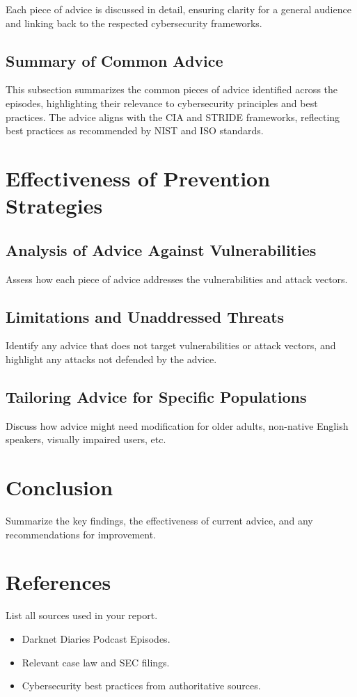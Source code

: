 \documentclass[11pt]{article}
\begin{document}
Each piece of advice is discussed in detail, ensuring clarity for a general audience and linking back to the respected cybersecurity frameworks.

\subsection{Summary of Common Advice}
This subsection summarizes the common pieces of advice identified across the episodes, highlighting their relevance to cybersecurity principles and best practices. The advice aligns with the CIA and STRIDE frameworks, reflecting best practices as recommended by NIST and ISO standards.

\section{Effectiveness of Prevention Strategies}
\subsection{Analysis of Advice Against Vulnerabilities}
Assess how each piece of advice addresses the vulnerabilities and attack vectors.

\subsection{Limitations and Unaddressed Threats}
Identify any advice that does not target vulnerabilities or attack vectors, and highlight any attacks not defended by the advice.

\subsection{Tailoring Advice for Specific Populations}
Discuss how advice might need modification for older adults, non-native English speakers, visually impaired users, etc.

\section{Conclusion}
Summarize the key findings, the effectiveness of current advice, and any recommendations for improvement.

\section{References}
List all sources used in your report.
\begin{itemize}
\item Darknet Diaries Podcast Episodes.
\item Relevant case law and SEC filings.
\item Cybersecurity best practices from authoritative sources.
\end{itemize}
\end{document}
